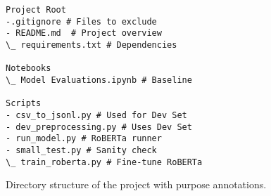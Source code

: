 \begin{figure}[ht]
\centering
\lstset{
  basicstyle=\ttfamily,
  columns=fullflexible,
  keepspaces=true,
  frame=single
}
\begin{lstlisting}
Project Root
-.gitignore # Files to exclude 
- README.md  # Project overview
\_ requirements.txt # Dependencies 

Notebooks
\_ Model Evaluations.ipynb # Baseline

Scripts
- csv_to_jsonl.py # Used for Dev Set 
- dev_preprocessing.py # Uses Dev Set
- run_model.py # RoBERTa runner
- small_test.py # Sanity check
\_ train_roberta.py # Fine-tune RoBERTa 
\end{lstlisting}
\caption{Directory structure of the project with purpose annotations.}
\label{fig:directory-structure}
\end{figure}

\vspace{-4mm}